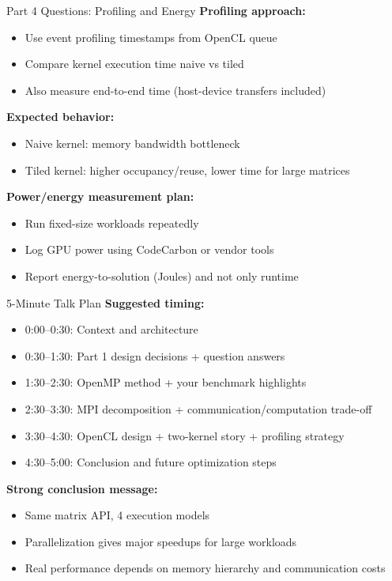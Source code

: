 \documentclass[aspectratio=169]{beamer}
\begin{document}
\begin{frame}{Part 4 Questions: Profiling and Energy}
\textbf{Profiling approach:}
\begin{itemize}
  \item Use event profiling timestamps from OpenCL queue
  \item Compare kernel execution time naive vs tiled
  \item Also measure end-to-end time (host-device transfers included)
\end{itemize}

\textbf{Expected behavior:}
\begin{itemize}
  \item Naive kernel: memory bandwidth bottleneck
  \item Tiled kernel: higher occupancy/reuse, lower time for large matrices
\end{itemize}

\textbf{Power/energy measurement plan:}
\begin{itemize}
  \item Run fixed-size workloads repeatedly
  \item Log GPU power using CodeCarbon or vendor tools
  \item Report energy-to-solution (Joules) and not only runtime
\end{itemize}
\end{frame}

\begin{frame}{5-Minute Talk Plan}
\textbf{Suggested timing:}
\begin{itemize}
  \item 0:00--0:30: Context and architecture
  \item 0:30--1:30: Part 1 design decisions + question answers
  \item 1:30--2:30: OpenMP method + your benchmark highlights
  \item 2:30--3:30: MPI decomposition + communication/computation trade-off
  \item 3:30--4:30: OpenCL design + two-kernel story + profiling strategy
  \item 4:30--5:00: Conclusion and future optimization steps
\end{itemize}

\textbf{Strong conclusion message:}
\begin{itemize}
  \item Same matrix API, 4 execution models
  \item Parallelization gives major speedups for large workloads
  \item Real performance depends on memory hierarchy and communication costs
\end{itemize}
\end{frame}
\end{document}

